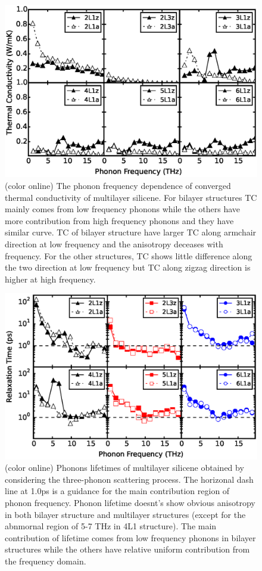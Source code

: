 \documentclass[review]{elsarticle}
\begin{document}
\begin{figure}[b]
  \includegraphics[width=1\linewidth]{images/tc_freq.eps}
  \caption{\label{fig:tc_freq} (color online)  The phonon frequency dependence of converged thermal conductivity of multilayer silicene. For bilayer structures TC mainly comes from low frequency phonons while the others have more contribution from high frequency phonons and they have similar curve. TC of bilayer structure have larger TC along armchair direction at low frequency and the anisotropy deceases with frequency. For the other structures, TC shows little difference along the two direction at low frequency but TC along zigzag direction is higher at high frequency. }
\end{figure}

\begin{figure}[b]
  \includegraphics[width=1\linewidth]{images/tau.eps}
  \caption{\label{fig:tau} (color online)  Phonons lifetimes of multilayer silicene obtained by considering the three-phonon scattering process.  The horizonal dash line at 1.0ps is a guidance for the main contribution region of phonon frequency. Phonon lifetime doesnt's show obvious anisotropy in both bilayer structure and multilayer structures (except for the abnmornal region of 5-7 THz in 4L1 structure). The main contribution of lifetime comes from low frequency phonons in bilayer structures while the others have relative uniform contribution from the frequency domain.  }
\end{figure}
\end{document}
